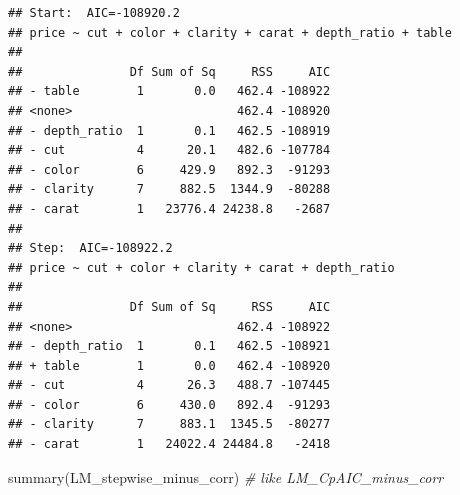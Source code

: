 \documentclass[
]{article}
\newenvironment{Shaded}{\begin{snugshade}}{\end{snugshade}}
\newcommand{\CommentTok}[1]{\textcolor[rgb]{0.56,0.35,0.01}{\textit{#1}}}
\newcommand{\FunctionTok}[1]{\textcolor[rgb]{0.00,0.00,0.00}{#1}}
\newcommand{\NormalTok}[1]{#1}
\begin{document}
\begin{verbatim}
## Start:  AIC=-108920.2
## price ~ cut + color + clarity + carat + depth_ratio + table
##
##               Df Sum of Sq     RSS     AIC
## - table        1       0.0   462.4 -108922
## <none>                       462.4 -108920
## - depth_ratio  1       0.1   462.5 -108919
## - cut          4      20.1   482.6 -107784
## - color        6     429.9   892.3  -91293
## - clarity      7     882.5  1344.9  -80288
## - carat        1   23776.4 24238.8   -2687
##
## Step:  AIC=-108922.2
## price ~ cut + color + clarity + carat + depth_ratio
##
##               Df Sum of Sq     RSS     AIC
## <none>                       462.4 -108922
## - depth_ratio  1       0.1   462.5 -108921
## + table        1       0.0   462.4 -108920
## - cut          4      26.3   488.7 -107445
## - color        6     430.0   892.4  -91293
## - clarity      7     883.1  1345.5  -80277
## - carat        1   24022.4 24484.8   -2418
\end{verbatim}

\begin{Shaded}
\begin{Highlighting}[]
\FunctionTok{summary}\NormalTok{(LM\_stepwise\_minus\_corr)   }\CommentTok{\# like LM\_CpAIC\_minus\_corr}
\end{Highlighting}
\end{Shaded}
\end{document}
